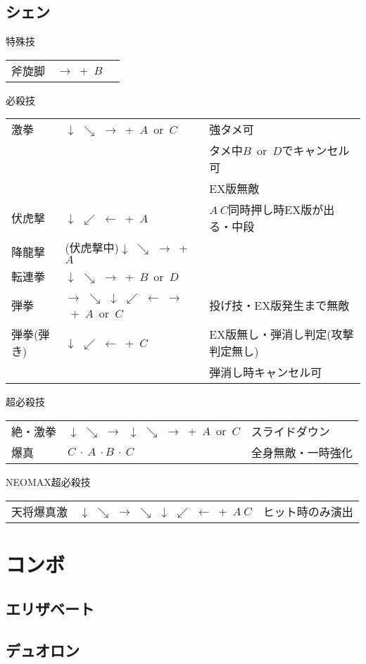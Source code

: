 \documentclass[a4j,11pt]{jarticle}
\def\hado{$\downarrow$ $\searrow$ $\rightarrow$}%
\def\tatsu{$\downarrow$ $\swarrow$ $\leftarrow$}%
\def\tenti{$\rightarrow$ $\searrow$ $\downarrow$ $\swarrow$ $\leftarrow$ $\rightarrow$}%
\def\ryuko{$\downarrow$ $\searrow$ $\rightarrow$ $\searrow$ $\downarrow$ $\swarrow$ $\leftarrow$}%
\begin{document}
\subsection{シェン}
\begin{itembox}[l]{特殊技}
\begin{tabular}{lll}
斧旋脚&$\rightarrow$\ +\ $B$&%
\end{tabular}
\end{itembox}
\begin{itembox}[l]{必殺技}
\begin{tabular}{lll}
激拳&\hado\ +\ $A$\ or\ $C$&強タメ可\\
&&タメ中$B$\ or\ $D$でキャンセル可\\%
&&EX版無敵\\
伏虎撃&\tatsu\ +\ $A$&$A\ C$同時押し時EX版が出る・中段\\%
降龍撃&(伏虎撃中)\hado\ +\ $A$&\\%
転連拳&\hado\ +\ $B$\ or\ $D$&\\%
弾拳&\tenti\ +\ $A$\ or\ $C$&投げ技・EX版発生まで無敵\\%
弾拳(弾き)&\tatsu\ +\ $C$&EX版無し・弾消し判定(攻撃判定無し)\\%
&&弾消し時キャンセル可
\end{tabular}
\end{itembox}
\begin{itembox}[l]{超必殺技}
\begin{tabular}{lll}
絶・激拳&\hado\ \hado\ +\ $A$\ or\ $C$&スライドダウン\\%
爆真&$C\ \cdot\ A\ \cdot B\ \cdot\ C$&全身無敵・一時強化%
\end{tabular}
\end{itembox}
\begin{itembox}[l]{NEOMAX超必殺技}
\begin{tabular}{lll}
天将爆真激&\ryuko\ +\ $A\ C$&ヒット時のみ演出%
\end{tabular}
\end{itembox}
\newpage
\section{コンボ}
\subsection{エリザベート}
\subsection{デュオロン}
\end{document}
